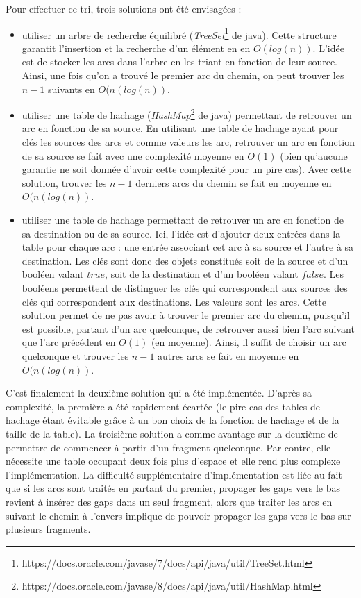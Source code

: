 \documentclass{article}
\begin{document}
Pour effectuer ce tri, trois solutions ont été envisagées :
\begin{itemize}
\item utiliser un arbre de recherche équilibré (\textit{TreeSet}\footnote{https://docs.oracle.com/javase/7/docs/api/java/util/TreeSet.html} de java). Cette structure garantit l'insertion et la recherche d'un élément en en $O(log(n))$. L'idée est de stocker les arcs dans l'arbre en les triant en fonction de leur source. Ainsi, une fois qu'on a trouvé le premier arc du chemin, on peut trouver les $n-1$ suivants en $O(n(log(n))$.

\item utiliser une table de hachage (\textit{HashMap}\footnote{https://docs.oracle.com/javase/8/docs/api/java/util/HashMap.html} de java) permettant de retrouver un arc en fonction de sa source. En utilisant une table de hachage ayant pour clés les sources des arcs et comme valeurs les arc, retrouver un arc en fonction de sa source se fait avec une complexité moyenne en $O(1)$ (bien qu'aucune garantie ne soit donnée d'avoir cette complexité pour un pire cas). Avec cette solution, trouver les $n-1$ derniers arcs du chemin se fait en moyenne en $O(n(log(n))$.

\item utiliser une table de hachage permettant de retrouver un arc en fonction de sa destination ou de sa source. Ici, l'idée est d'ajouter deux entrées dans la table pour chaque arc : une entrée associant cet arc à sa source et l'autre à sa destination. Les clés sont donc des objets constitués soit de la source et d'un booléen valant $true$, soit de la destination et d'un booléen valant $false$. Les booléens permettent de distinguer les clés qui correspondent aux sources des clés qui correspondent aux destinations. Les valeurs sont les arcs. Cette solution permet de ne pas avoir à trouver le premier arc du chemin, puisqu'il est possible, partant d'un arc quelconque, de retrouver aussi bien l'arc suivant que l'arc précédent en $O(1)$ (en moyenne). Ainsi, il suffit de choisir un arc quelconque et trouver les $n-1$ autres arcs se fait en moyenne en $O(n(log(n))$.
\end{itemize}

C'est finalement la deuxième solution qui a été implémentée. D'après sa complexité, la première a été rapidement écartée (le pire cas des tables de hachage étant évitable grâce à un bon choix de la fonction de hachage et de la taille de la table). 
La troisième solution a comme avantage sur la deuxième de permettre de commencer à partir d'un fragment quelconque. Par contre, elle nécessite une table occupant deux fois plus d'espace et elle rend plus complexe l'implémentation. La difficulté supplémentaire d'implémentation est liée au fait que si les arcs sont traités en partant du premier, propager les gaps vers le bas revient à insérer des gaps dans un seul fragment, alors que traiter les arcs en suivant le chemin à l'envers implique de pouvoir propager les gaps vers le bas sur plusieurs fragments.
\end{document}
